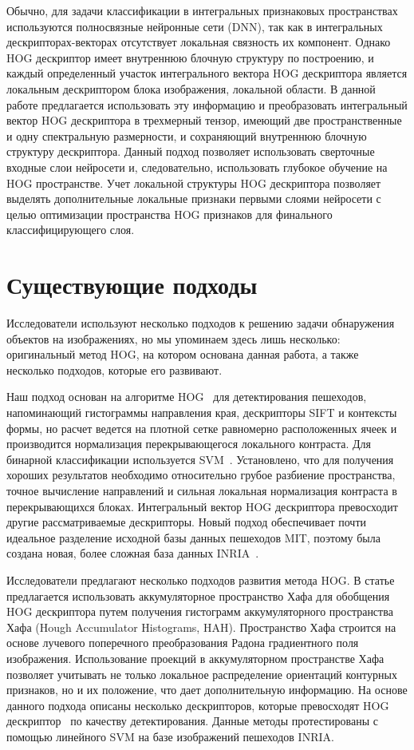 \documentclass[12pt,twoside]{article}
\begin{document}
Обычно, для задачи классификации в интегральных признаковых пространствах используются полносвязные нейронные сети (DNN), так как в интегральных дескрипторах-векторах отсутствует локальная связность их компонент. Однако HOG дескриптор имеет внутреннюю блочную структуру по построению, и каждый определенный участок интегрального вектора HOG дескриптора является локальным дескриптором блока изображения, локальной области. В данной работе предлагается использовать эту информацию и преобразовать интегральный вектор HOG дескриптора в трехмерный тензор, имеющий две пространственные и одну спектральную размерности, и сохраняющий внутреннюю блочную структуру дескриптора. Данный подход позволяет использовать сверточные входные слои нейросети и, следовательно, использовать глубокое обучение на HOG пространстве. Учет локальной структуры HOG дескриптора позволяет выделять дополнительные локальные признаки первыми слоями нейросети с целью оптимизации пространства HOG признаков для финального классифицирующего слоя.

\section{Существующие подходы}
Исследователи используют несколько подходов к решению задачи обнаружения объектов на изображениях, но мы упоминаем здесь лишь несколько: оригинальный метод HOG, на котором основана данная работа, а также несколько подходов, которые его развивают. 

Наш подход основан на алгоритме HOG~\cite{dalaltriggs2005} для детектирования пешеходов, напоминающий гистограммы направления края, дескрипторы SIFT и контексты формы, но расчет ведется на плотной сетке равномерно расположенных ячеек и производится нормализация перекрывающегося локального контраста. Для бинарной классификации используется SVM~\cite{Vorontsov}. Установлено, что для получения хороших результатов необходимо относительно грубое разбиение пространства, точное вычисление направлений и сильная локальная нормализация контраста в перекрывающихся блоках. Интегральный вектор HOG дескриптора превосходит другие рассматриваемые дескрипторы. Новый подход обеспечивает почти идеальное разделение исходной базы данных пешеходов MIT, поэтому была создана новая, более сложная база данных INRIA~\cite{inria}.

Исследователи предлагают несколько подходов развития метода HOG. В статье~\cite{Samsonov17} предлагается использовать аккумуляторное пространство Хафа для обобщения HOG дескриптора путем получения гистограмм аккумуляторного пространства Хафа (Hough Accumulator Histograms, HAH). Пространство Хафа строится на основе лучевого поперечного преобразования Радона градиентного поля изображения. Использование проекций в аккумуляторном пространстве Хафа позволяет учитывать не только локальное распределение ориентаций контурных признаков, но и их положение, что дает дополнительную информацию. На основе данного подхода описаны несколько дескрипторов, которые превосходят HOG дескриптор~\cite{dalaltriggs2005} по качеству детектирования. Данные методы протестированы с помощью линейного SVM  на базе изображений пешеходов INRIA. 
\end{document}
